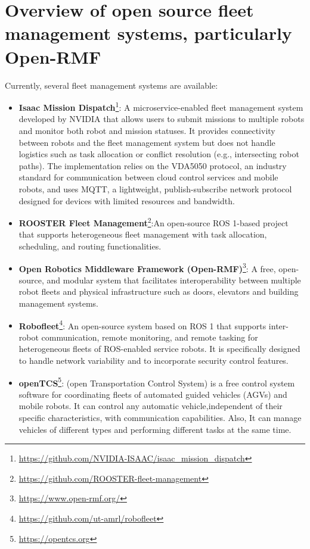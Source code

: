 \section{Overview of open source fleet management systems, particularly Open-RMF}\label{lab:rmf}
Currently, several fleet management systems are available:
\begin{itemize}
	\item \textbf{Isaac Mission Dispatch}\footnote{\href{https://github.com/NVIDIA-ISAAC/isaac_mission_dispatch}{https://github.com/NVIDIA-ISAAC/isaac\_mission\_dispatch}}: A microservice-enabled fleet management system developed by NVIDIA that allows users to submit missions to multiple robots and monitor both robot and mission statuses. It provides connectivity between robots and the fleet management system but does not handle logistics such as task allocation or conflict resolution (e.g., intersecting robot paths). The implementation relies on the VDA5050 protocol, an industry standard for communication between cloud control services and mobile robots, and uses MQTT, a lightweight, publish-subscribe network protocol designed for devices with limited resources and bandwidth.	
	\item \textbf{ROOSTER Fleet Management}\footnote{\href{https://github.com/ROOSTER-fleet-management}{https://github.com/ROOSTER-fleet-management}}:An open-source ROS 1-based project that supports heterogeneous fleet management with task allocation, scheduling, and routing functionalities.
	\item \textbf{Open Robotics Middleware Framework (Open-RMF)}\footnote{\href{https://www.open-rmf.org/}{https://www.open-rmf.org/}}: A free, open-source, and modular system that facilitates interoperability between multiple robot fleets and physical infrastructure such as doors, elevators and building management systems.
	\item \textbf{Robofleet}\footnote{\href{https://github.com/ut-amrl/robofleet}{https://github.com/ut-amrl/robofleet}}\cite{sikand2021robofleetopensourcecommunication}: An open-source system based on ROS 1 that supports inter-robot communication, remote monitoring, and remote tasking for heterogeneous fleets of ROS-enabled service robots. It is specifically designed to handle network variability and to incorporate security control features.
	\item \textbf{openTCS}\footnote{\href{https://opentcs.org}{https://opentcs.org}}: (open Transportation Control System) is a free control system software for coordinating fleets of automated guided vehicles (AGVs) and mobile robots. It can control any automatic vehicle,independent of their specific characteristics, with communication capabilities. Also, It can manage vehicles of different types and performing different tasks at the same time.
\end{itemize}
